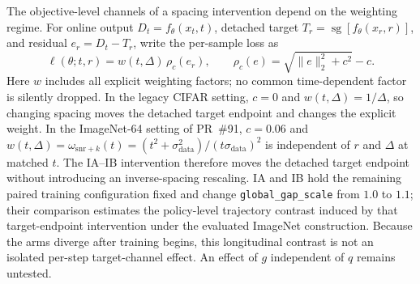 The objective-level channels of a spacing intervention depend on the weighting
regime.  For online output $D_t=f_\theta(x_t,t)$, detached target
$T_r=\operatorname{sg}[f_\theta(x_r,r)]$, and residual $e_r=D_t-T_r$, write
the per-sample loss as
\begin{equation}
  \ell(\theta;t,r)
  =w(t,\Delta)\,\rho_c(e_r),
  \qquad
  \rho_c(e)=\sqrt{\lVert e\rVert_2^2+c^2}-c.
  \label{eq:spacing-objective}
\end{equation}
Here $w$ includes all explicit weighting factors; no common time-dependent
factor is silently dropped.  In the legacy CIFAR setting,
$c=0$ and $w(t,\Delta)=1/\Delta$, so changing spacing moves the detached
target endpoint and changes the explicit weight.  In the ImageNet-64 setting
of PR~\#91, $c=0.06$ and
$w(t,\Delta)=\omega_{\mathrm{snr}+k}(t)
=(t^2+\sigma_{\mathrm{data}}^2)/(t\sigma_{\mathrm{data}})^2$ is independent of
$r$ and $\Delta$ at matched $t$.  The IA--IB intervention therefore moves
the detached target endpoint without introducing an inverse-spacing
rescaling.  IA and IB hold the remaining paired training configuration fixed
and change \texttt{global\_gap\_scale} from $1.0$ to $1.1$; their comparison
estimates the policy-level trajectory contrast induced by that target-endpoint
intervention under the evaluated ImageNet construction.  Because the arms
diverge after training begins, this longitudinal contrast is not an isolated
per-step target-channel effect.  An effect of $g$ independent of $q$ remains
untested.
